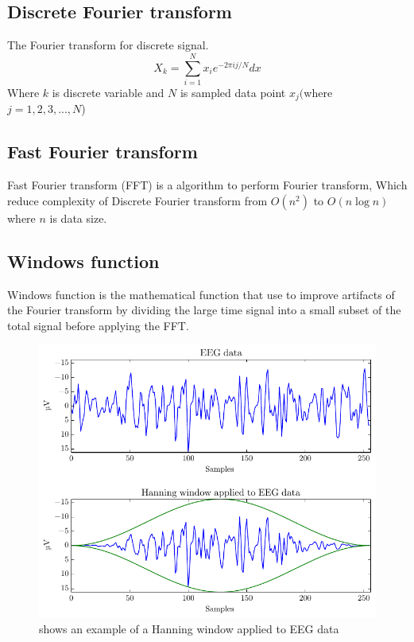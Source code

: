 \subsection{Discrete Fourier transform}
The Fourier transform for discrete signal. 
\begin{equation}\label{eq:dft}
	X_k = \sum\limits ^{N}_{i=1} x_i e^{-2\pi ij/N}dx
\end{equation}
Where $k$ is discrete variable and $N$ is sampled data point $x_j($where $j=1,2,3,...,N$)

\subsection{Fast Fourier transform}
\hspace{1.5cm} Fast Fourier transform (FFT) is a algorithm to perform Fourier transform, Which reduce complexity of Discrete Fourier transform from $O(n^2)$ to $O(n \log n)$ where $n$ is data size.
\pagebreak
\subsection{Windows function}
\hspace{1.5cm} Windows function is the mathematical function that use to improve artifacts of the Fourier transform by dividing the large time signal into a small subset of the total signal before applying the FFT.\\

\begin{figure}[ht]
	\centering
	\includegraphics[scale = 0.75]{chapter3/window.pdf}
	\caption{shows an example of a Hanning window applied to EEG data\cite{ft}}
    \label{fig:window}
\end{figure}


